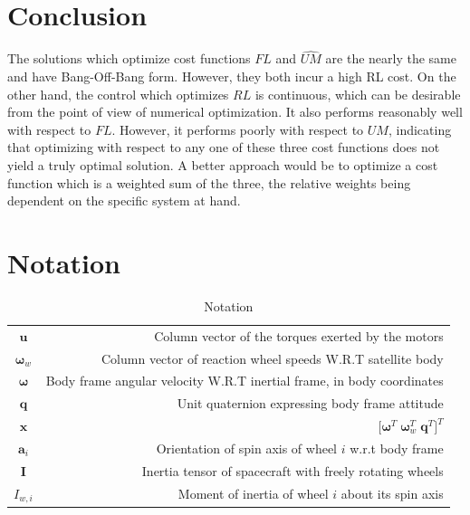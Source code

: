 \documentclass[letterpaper, paper,11pt]{AAS}		%
\begin{document}
\section{Conclusion}
The solutions which optimize cost functions $FL$ and $\hat{UM}$ are the nearly the same and have Bang-Off-Bang form. However, they both incur a high RL cost. On the other hand, the control which optimizes $RL$ is continuous, which can be desirable from the point of view of numerical optimization. It also performs reasonably well with respect to $FL$. However, it performs poorly with respect to $UM$, indicating that optimizing with respect to any one of these three cost functions does not yield a truly optimal solution. A better approach would be to optimize a cost function which is a weighted sum of the three, the relative weights being dependent on the specific system at hand. 

\section{Notation}
\begin{table}[h!]
	\fontsize{10}{10}\selectfont
    \caption{Notation}
   \label{tab:notation}
        \centering 
   \begin{tabular}{c r } %
      \hline 
      $\mathbf{u}$ & Column vector of the torques exerted by the motors  \\
      $\pmb{\omega}_{w}$      & Column vector of reaction wheel speeds W.R.T satellite body \\
      $\pmb{\omega}$       & Body frame angular velocity W.R.T inertial frame, in body coordinates \\
      $\pmb{q}$      & Unit quaternion expressing body frame attitude \\
      $\pmb{x}$ & $\lbrack 
      \pmb{\omega}^T \;\pmb{\omega}_{w}^{T} \; \pmb{q}^{T}
      \rbrack^{T}$\\
      $\pmb{a}_{i}$ & Orientation of spin axis of wheel $i$ w.r.t body frame \\
      $\pmb{I}$ & Inertia tensor of spacecraft with freely rotating wheels \\
      $I_{w,i}$ & Moment of inertia of wheel $i$ about its spin axis \\
      \hline
   \end{tabular}
\end{table}
\end{document}
